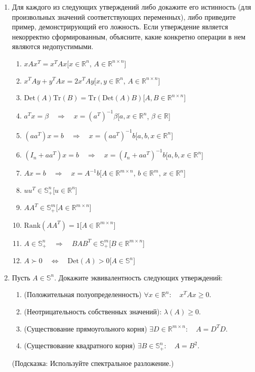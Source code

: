 \documentclass{article}
\newcommand{\R}{\mathbb{R}}
\renewcommand{\S}{\mathbb{S}}
\DeclareMathOperator{\Forall}{\forall}
\newcommand{\Tr}{\mathrm{Tr}}
\newcommand{\Det}{\mathrm{Det}}
\newcommand{\Rank}{\mathrm{Rank}}
\begin{document}
\begin{enumerate}[label=\textbf{\arabic*}, leftmargin=0em]
\item Для каждого из следующих утверждений либо докажите его истинность (для произвольных значений соответствующих переменных), либо приведите пример, демонстрирующий его ложность. Если утверждение является некорректно сформированным, объясните, какие конкретно операции в нем являются недопустимыми.
\begin{enumerate}
	\item $xAx^T = x^TAx$\hfill[$x \in \R^n$, $A \in \R^{n \times n}$]
	\item $x^TAy + y^TAx = 2x^TAy$\hfill[$x, y \in \R^n$, $A \in \R^{n \times n}$]
	\item $\Det(A) \Tr(B) = \Tr(\Det(A) B)$\hfill[$A, B \in \R^{n \times n}$]
	\item $a^T x = \beta \quad \Rightarrow \quad x = (a^T)^{-1} \beta$\hfill[$a, x \in \R^n$, $\beta \in \R$]
	\item $(a a^T)x = b \quad \Rightarrow \quad x = (aa^T)^{-1} b$\hfill[$a, b, x \in \R^n$]
	\item $(I_n + a a^T)x = b \quad \Rightarrow \quad x = (I_n + aa^T)^{-1} b$\hfill[$a, b, x \in \R^n$]
	\item $A x = b \quad \Rightarrow \quad x = A^{-1} b$\hfill[$A \in \R^{m \times n}$, $b \in \R^m$, $x \in \R^n$]
	\item $u u^T \in \S^n_+$\hfill[$u \in \R^n$]
	\item $AA^T \in \S^m_+$\hfill[$A \in \R^{m \times n}$]
	\item $\Rank(A A^T) = 1$\hfill[$A \in \R^{m \times n}$]
	\item $A \in \S^n_+ \quad \Rightarrow \quad B A B^T \in \S^m_+$\hfill[$B \in \R^{m \times n}$]
	\item $A \succ 0 \quad \Leftrightarrow \quad \Det(A) > 0$\hfill[$A \in \S^n$]
\end{enumerate}

\item Пусть $A \in \S^n$. Докажите эквивалентность следующих утверждений:
\begin{enumerate}
\item (Положительная полуопределенность) $\Forall x \in \R^n: \quad x^T A x \geq 0$.
\item (Неотрицательность собственных значений): $\lambda(A) \geq 0$.
\item (Существование прямоугольного корня) $\exists D \in \R^{m \times n}: \quad A = D^T D$.
\item (Существование квадратного корня) $\exists B \in \S^n_+: \quad A = B^2$.
\end{enumerate}
(Подсказка: Используйте спектральное разложение.)


\end{enumerate}
\end{document}
